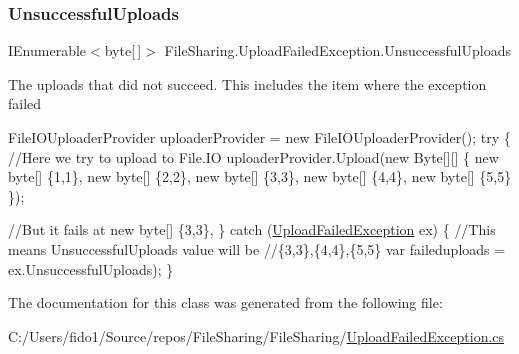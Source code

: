 \subsubsection{\texorpdfstring{Unsuccessful\+Uploads}{UnsuccessfulUploads}}
{\footnotesize\ttfamily I\+Enumerable$<$byte\mbox{[}$\,$\mbox{]}$>$ File\+Sharing.\+Upload\+Failed\+Exception.\+Unsuccessful\+Uploads\hspace{0.3cm}{\ttfamily [get]}}



The uploads that did not succeed. This includes the item where the exception failed 


\begin{DoxyCode}
FileIOUploaderProvider uploaderProvider = \textcolor{keyword}{new} FileIOUploaderProvider();
\textcolor{keywordflow}{try}
\{
    \textcolor{comment}{//Here we try to upload to File.IO}
    uploaderProvider.Upload(\textcolor{keyword}{new} Byte[][]
                            \{
                            \textcolor{keyword}{new} byte[] \{1,1\},
                            \textcolor{keyword}{new} byte[] \{2,2\},
                            \textcolor{keyword}{new} byte[] \{3,3\},
                            \textcolor{keyword}{new} byte[] \{4,4\},
                            \textcolor{keyword}{new} byte[] \{5,5\}
                            \});

    \textcolor{comment}{//But it fails at new byte[] \{3,3\},}
\}
\textcolor{keywordflow}{catch} (\hyperlink{class_file_sharing_1_1_upload_failed_exception_a695f2b76a11171b4ac7b749eeeb8f09b}{UploadFailedException} ex)
\{
    \textcolor{comment}{//This means UnsuccessfulUploads value will be }
    \textcolor{comment}{//\{3,3\},\{4,4\},\{5,5\}}
    var faileduploads = ex.UnsuccessfulUploads);
\}        
\end{DoxyCode}
 

The documentation for this class was generated from the following file\+:\begin{DoxyCompactItemize}
\item 
C\+:/\+Users/fido1/\+Source/repos/\+File\+Sharing/\+File\+Sharing/\hyperlink{_upload_failed_exception_8cs}{Upload\+Failed\+Exception.\+cs}\end{DoxyCompactItemize}

